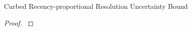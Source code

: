 \begin{theorem}{Curbed Recency-proportional Resolution Uncertainty Bound}
\label{thm:curbed-recency-proportional-resolution-algo-uncertainty-bound}

\end{theorem}

\begin{proof}
\label{prf:curbed-recency-proportional-resolution-algo-uncertainty-bound}

\end{proof}
